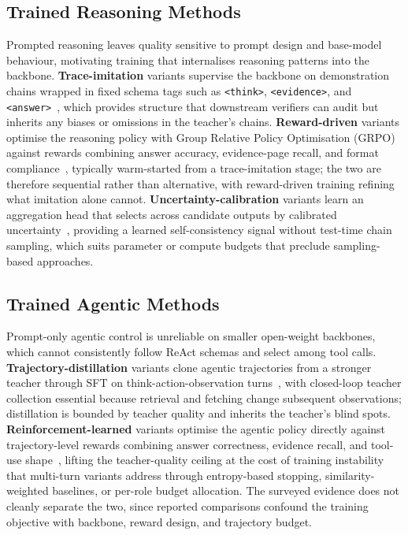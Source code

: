 \documentclass[11pt]{article}
\begin{document}
\subsection{Trained Reasoning Methods}
\label{sec:train-reasoning}
Prompted reasoning leaves quality sensitive to prompt design and base-model behaviour, motivating training that internalises reasoning patterns into the backbone. \textbf{Trace-imitation} variants supervise the backbone on demonstration chains wrapped in fixed schema tags such as \texttt{<think>}, \texttt{<evidence>}, and \texttt{<answer>}~\cite{yan2025docseeker}, which provides structure that downstream verifiers can audit but inherits any biases or omissions in the teacher's chains. \textbf{Reward-driven} variants optimise the reasoning policy with Group Relative Policy Optimisation (GRPO) against rewards combining answer accuracy, evidence-page recall, and format compliance~\cite{xiong2026docr1, xu2026mmr5}, typically warm-started from a trace-imitation stage; the two are therefore sequential rather than alternative, with reward-driven training refining what imitation alone cannot. \textbf{Uncertainty-calibration} variants learn an aggregation head that selects across candidate outputs by calibrated uncertainty~\cite{hannan2025docslm}, providing a learned self-consistency signal without test-time chain sampling, which suits parameter or compute budgets that preclude sampling-based approaches.

\subsection{Trained Agentic Methods}
\label{sec:train-agentic}
Prompt-only agentic control is unreliable on smaller open-weight backbones, which cannot consistently follow ReAct schemas and select among tool calls. \textbf{Trajectory-distillation} variants clone agentic trajectories from a stronger teacher through SFT on think-action-observation turns~\cite{zheng2026docvstar, zhang2026docdancer}, with closed-loop teacher collection essential because retrieval and fetching change subsequent observations; distillation is bounded by teacher quality and inherits the teacher's blind spots. \textbf{Reinforcement-learned} variants optimise the agentic policy directly against trajectory-level rewards combining answer correctness, evidence recall, and tool-use shape~\cite{wang2026vragrl, lin2026mmdocr1}, lifting the teacher-quality ceiling at the cost of training instability that multi-turn variants address through entropy-based stopping, similarity-weighted baselines, or per-role budget allocation. The surveyed evidence does not cleanly separate the two, since reported comparisons confound the training objective with backbone, reward design, and trajectory budget.
\end{document}
